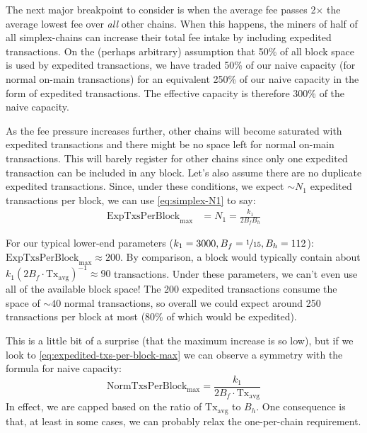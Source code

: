 The next major breakpoint to consider is when the average fee passes 2$\times$ the average lowest fee over \emph{all} other chains.
When this happens, the miners of half of all simplex-chains can increase their total fee intake by including expedited \cL transactions.
On the (perhaps arbitrary) assumption that 50\% of all \cL block space is used by expedited transactions,
we have traded 50\% of our naive capacity (for normal on-main transactions) for an equivalent 250\% of our naive capacity in the form of expedited transactions.
The effective capacity is therefore 300\% of the naive capacity.

As the fee pressure increases further, other chains will become saturated with expedited transactions and there might be no space left for normal on-main transactions.
This will barely register for other chains since only one expedited \cL transaction can be included in any \cR block.
Let's also assume there are no duplicate expedited transactions.
Since, under these conditions, we expect $\sim N_1$ expedited transactions per \cL block, we can use \autoref{eq:simplex-N1} to say:
\begin{align}
    \text{ExpTxsPerBlock}_\text{max} &= N_1 = \frac{k_1}{2 B_f B_h}
    \label{eq:expedited-txs-per-block-max}
\end{align}


For our typical lower-end parameters ($k_1 = 3000, B_f = \nicefrac{1}{15}, B_h = 112$): $\text{ExpTxsPerBlock}_\text{max} \approx 200$.
By comparison, a block would typically contain about $k_1 (2 B_f \cdot \text{Tx}_\text{avg})^{-1} \approx 90$ transactions.
Under these parameters, we can't even use all of the available block space!
The 200 expedited transactions consume the space of $\sim 40$ normal transactions, so overall we could expect around 250 transactions per block at most (80\% of which would be expedited).

This is a little bit of a surprise (that the maximum increase is so low), but if we look to \autoref{eq:expedited-txs-per-block-max} we can observe a symmetry with the formula for naive capacity:
$$
\text{NormTxsPerBlock}_\text{max} = \frac{k_1}{2 B_f \cdot \text{Tx}_\text{avg}}
$$
In effect, we are capped based on the ratio of $\text{Tx}_\text{avg}$ to $B_h$.
One consequence is that, at least in some cases, we can probably relax the one-per-chain requirement.

